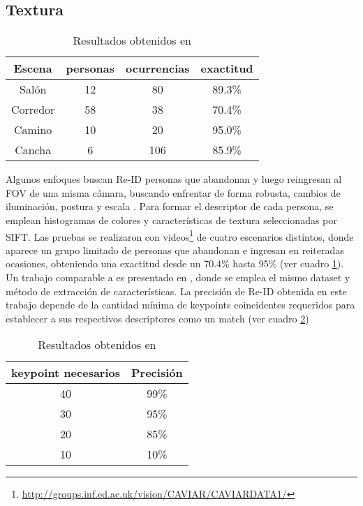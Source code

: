 \documentclass[../memoria.tex]{subfiles}
\begin{document}
\subsection{Textura}
\begin{table}
  \begin{center}
    \begin{tabular}{cccc}
      \hline
      Escena    & personas  & ocurrencias & exactitud \\
      \hline
      Salón     & 12        & 80          & 89.3\% \\
      Corredor  & 58        & 38          & 70.4\% \\
      Camino    & 10        & 20          & 95.0\% \\
      Cancha    & 6         & 106         & 85.9\% \\
      \hline
    \end{tabular}  
  \end{center}
  \caption{Resultados obtenidos en  \cite{hu2008people}}
\label{resultados SIFT hu2008}
\end{table}
\indent Algunos enfoques buscan Re-ID personas que abandonan y luego reingresan al FOV de una misma cámara, buscando enfrentar de forma robusta, cambios de iluminación, postura y escala \cite{hu2008people}. Para formar el descriptor de cada persona, se emplean histogramas de colores y características de textura seleccionadas por SIFT. Las pruebas se realizaron con videos\footnote{\url{http://groups.inf.ed.ac.uk/vision/CAVIAR/CAVIARDATA1/}} de cuatro escenarios distintos, donde aparece un grupo limitado de personas que abandonan e ingresan en reiteradas ocasiones, obteniendo una exactitud desde un 70.4\% hasta 95\% (ver cuadro \ref{resultados SIFT hu2008}). Un trabajo comparable a \cite{hu2008people} es presentado en \cite{hamdoun2008person}, donde se emplea el mismo dataset y método de extracción de características. La precisión de Re-ID obtenida en este trabajo depende de la cantidad mínima de keypoints coincidentes requeridos para establecer a sus respectivos descriptores como un match (ver cuadro \ref{resultados SIFT hamdoun2008person})  

\begin{table}
  \begin{center}
    \begin{tabular}{cc}
      \hline
      keypoint necesarios & Precisión \\
      \hline
      40 & 99\% \\
      30 & 95\% \\
      20 & 85\% \\
      10 & 10\% \\
      \hline
    \end{tabular}  
  \end{center}
  \caption{Resultados obtenidos en  \cite{hamdoun2008person}}
\label{resultados SIFT hamdoun2008person}
\end{table}
\end{document}
